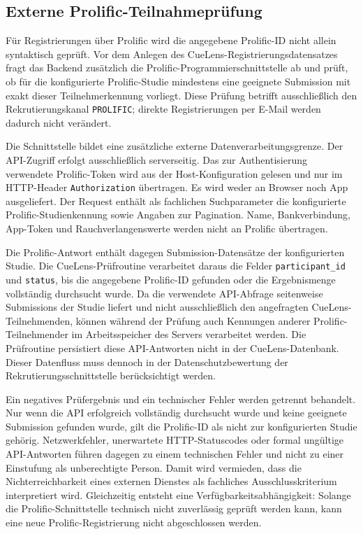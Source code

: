 
\begin{neu}
\section{Externe Prolific-Teilnahmeprüfung}

Für Registrierungen über Prolific wird die angegebene Prolific-ID nicht allein syntaktisch geprüft. Vor dem Anlegen des CueLens-Registrierungsdatensatzes fragt das Backend zusätzlich die Prolific-Programmierschnittstelle ab und prüft, ob für die konfigurierte Prolific-Studie mindestens eine geeignete Submission mit exakt dieser Teilnehmerkennung vorliegt. Diese Prüfung betrifft ausschließlich den Rekrutierungskanal \texttt{PROLIFIC}; direkte Registrierungen per E-Mail werden dadurch nicht verändert.

Die Schnittstelle bildet eine zusätzliche externe Datenverarbeitungsgrenze. Der API-Zugriff erfolgt ausschließlich serverseitig. Das zur Authentisierung verwendete Prolific-Token wird aus der Host-Konfiguration gelesen und nur im HTTP-Header \texttt{Authorization} übertragen. Es wird weder an Browser noch App ausgeliefert. Der Request enthält als fachlichen Suchparameter die konfigurierte Prolific-Studienkennung sowie Angaben zur Pagination. Name, Bankverbindung, App-Token und Rauchverlangenswerte werden nicht an Prolific übertragen.

Die Prolific-Antwort enthält dagegen Submission-Datensätze der konfigurierten Studie. Die CueLens-Prüfroutine verarbeitet daraus die Felder \texttt{participant\_id} und \texttt{status}, bis die angegebene Prolific-ID gefunden oder die Ergebnismenge vollständig durchsucht wurde. Da die verwendete API-Abfrage seitenweise Submissions der Studie liefert und nicht ausschließlich den angefragten CueLens-Teilnehmenden, können während der Prüfung auch Kennungen anderer Prolific-Teilnehmender im Arbeitsspeicher des Servers verarbeitet werden. Die Prüfroutine persistiert diese API-Antworten nicht in der CueLens-Datenbank. Dieser Datenfluss muss dennoch in der Datenschutzbewertung der Rekrutierungsschnittstelle berücksichtigt werden.

Ein negatives Prüfergebnis und ein technischer Fehler werden getrennt behandelt. Nur wenn die API erfolgreich vollständig durchsucht wurde und keine geeignete Submission gefunden wurde, gilt die Prolific-ID als nicht zur konfigurierten Studie gehörig. Netzwerkfehler, unerwartete HTTP-Statuscodes oder formal ungültige API-Antworten führen dagegen zu einem technischen Fehler und nicht zu einer Einstufung als unberechtigte Person. Damit wird vermieden, dass die Nichterreichbarkeit eines externen Dienstes als fachliches Ausschlusskriterium interpretiert wird. Gleichzeitig entsteht eine Verfügbarkeitsabhängigkeit: Solange die Prolific-Schnittstelle technisch nicht zuverlässig geprüft werden kann, kann eine neue Prolific-Registrierung nicht abgeschlossen werden.
\end{neu}
